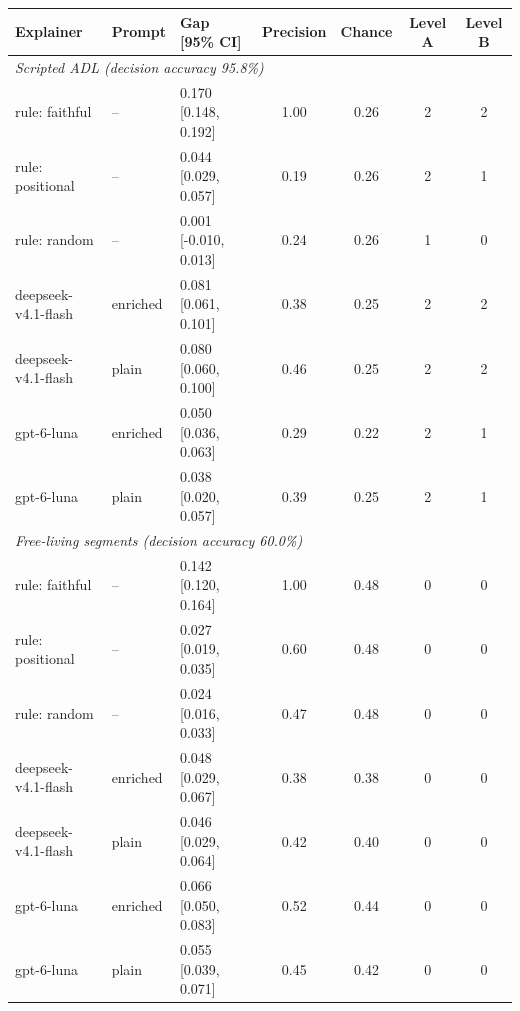 \begin{tabular}{lllcccc}
\toprule
Explainer & Prompt & Gap [95\% CI] & Precision & Chance & Level A & Level B \\
\midrule
\multicolumn{7}{l}{\emph{Scripted ADL (decision accuracy 95.8\%)}} \\
rule: faithful & -- & 0.170 [0.148, 0.192] & 1.00 & 0.26 & 2 & 2 \\
rule: positional & -- & 0.044 [0.029, 0.057] & 0.19 & 0.26 & 2 & 1 \\
rule: random & -- & 0.001 [-0.010, 0.013] & 0.24 & 0.26 & 1 & 0 \\
deepseek-v4.1-flash & enriched & 0.081 [0.061, 0.101] & 0.38 & 0.25 & 2 & 2 \\
deepseek-v4.1-flash & plain & 0.080 [0.060, 0.100] & 0.46 & 0.25 & 2 & 2 \\
gpt-6-luna & enriched & 0.050 [0.036, 0.063] & 0.29 & 0.22 & 2 & 1 \\
gpt-6-luna & plain & 0.038 [0.020, 0.057] & 0.39 & 0.25 & 2 & 1 \\
\midrule
\multicolumn{7}{l}{\emph{Free-living segments (decision accuracy 60.0\%)}} \\
rule: faithful & -- & 0.142 [0.120, 0.164] & 1.00 & 0.48 & 0 & 0 \\
rule: positional & -- & 0.027 [0.019, 0.035] & 0.60 & 0.48 & 0 & 0 \\
rule: random & -- & 0.024 [0.016, 0.033] & 0.47 & 0.48 & 0 & 0 \\
deepseek-v4.1-flash & enriched & 0.048 [0.029, 0.067] & 0.38 & 0.38 & 0 & 0 \\
deepseek-v4.1-flash & plain & 0.046 [0.029, 0.064] & 0.42 & 0.40 & 0 & 0 \\
gpt-6-luna & enriched & 0.066 [0.050, 0.083] & 0.52 & 0.44 & 0 & 0 \\
gpt-6-luna & plain & 0.055 [0.039, 0.071] & 0.45 & 0.42 & 0 & 0 \\
\bottomrule
\end{tabular}

